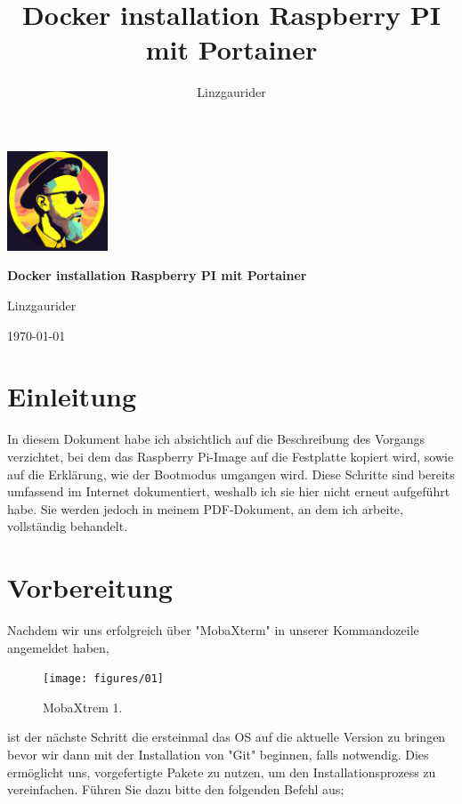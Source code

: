 \documentclass[a4paper]{article}
\title{Docker installation Raspberry PI mit Portainer}
\author{Linzgaurider}
\begin{document}
	
		\begin{titlepage}
			\begin{center}
				\includegraphics[width=3cm]{figures/logo} %
				\vspace{1cm}
				
				\Huge \textbf{Docker installation Raspberry PI mit Portainer}
				
				\vspace{2cm}
				
				\Large Linzgaurider
				
				\vspace{2cm}
				
				\fbox{\Huge \ccbyncsa{}}
				\vfill
				
				\today
			\end{center}
		\end{titlepage}

	\tableofcontents
	\newpage
	
	\section{Einleitung}
	In diesem Dokument habe ich absichtlich auf die Beschreibung des Vorgangs verzichtet, bei dem das Raspberry Pi-Image auf die Festplatte kopiert wird, sowie auf die Erklärung, wie der Bootmodus umgangen wird. Diese Schritte sind bereits umfassend im Internet dokumentiert, weshalb ich sie hier nicht erneut aufgeführt habe. Sie werden jedoch in meinem PDF-Dokument, an dem ich arbeite, vollständig behandelt.
	
	\section{Vorbereitung}
	Nachdem wir uns erfolgreich über "MobaXterm" in unserer Kommandozeile angemeldet haben, 
		\begin{figure}[htbp]
		\centering
		\texttt{[image: figures/01]}
		\caption{MobaXtrem 1.}
		\label{fig:MobaXtrem Darstellung}
	\end{figure}
	ist der nächste Schritt die ersteinmal das OS auf die aktuelle Version zu bringen bevor wir dann mit der  Installation von "Git" beginnen, falls notwendig. Dies ermöglicht uns, vorgefertigte Pakete zu nutzen, um den Installationsprozess zu vereinfachen. Führen Sie dazu bitte den folgenden Befehl aus;
	
\end{document}
